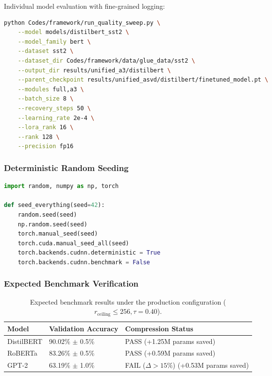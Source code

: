 Individual model evaluation with fine-grained logging:

\begin{lstlisting}[language=bash]
python Codes/framework/run_quality_sweep.py \
    --model models/distilbert_sst2 \
    --model_family bert \
    --dataset sst2 \
    --dataset_dir Codes/framework/data/glue_data/sst2 \
    --output_dir results/unified_a3/distilbert \
    --parent_checkpoint results/unified_asvd/distilbert/finetuned_model.pt \
    --modules full,a3 \
    --batch_size 8 \
    --recovery_steps 50 \
    --learning_rate 2e-4 \
    --lora_rank 16 \
    --rank 128 \
    --precision fp16
\end{lstlisting}

\subsubsection{Deterministic Random Seeding}

\begin{lstlisting}[language=python]
import random, numpy as np, torch

def seed_everything(seed=42):
    random.seed(seed)
    np.random.seed(seed)
    torch.manual_seed(seed)
    torch.cuda.manual_seed_all(seed)
    torch.backends.cudnn.deterministic = True
    torch.backends.cudnn.benchmark = False
\end{lstlisting}

\subsubsection{Expected Benchmark Verification}

\begin{table}[H]
\centering
\small
\begin{tabular}{lll}
\toprule
\textbf{Model} & \textbf{Validation Accuracy} & \textbf{Compression Status} \\
\midrule
DistilBERT & 90.02\% $\pm$ 0.5\% & PASS (+1.25M params saved) \\
RoBERTa    & 83.26\% $\pm$ 0.5\% & PASS (+0.59M params saved) \\
GPT-2      & 63.19\% $\pm$ 1.0\% & FAIL ($\Delta > 15\%$) (+0.53M params saved) \\
\bottomrule
\end{tabular}
\caption{Expected benchmark results under the production configuration ($r_{\mathrm{ceiling}} \le 256, \tau=0.40$).}
\label{tab:app_repro_expected}
\end{table}